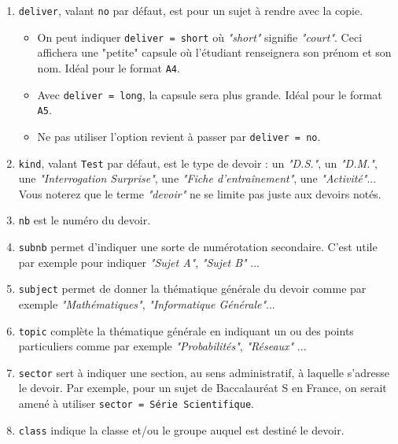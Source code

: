 \documentclass[12pt,a4paper]{scrartcl}
\theoremstyle{definition}
\begin{document}
\begin{enumerate}
    \item \verb+deliver+, valant \verb+no+ par défaut, est pour un sujet à rendre avec la copie.
    \begin{itemize}
        \setlength\itemsep{0em}

        \item On peut indiquer \verb+deliver = short+ où \emph{"short"} signifie \emph{"court"}. Ceci affichera une "petite" capsule où l'étudiant renseignera son prénom et son nom. Idéal pour le format \verb+A4+.

        \item Avec \verb+deliver = long+, la capsule sera plus grande. Idéal pour le format \verb+A5+.

        \item Ne pas utiliser l'option revient à passer par \verb+deliver = no+.
    \end{itemize}

    \item \verb+kind+, valant \verb+Test+ par défaut, est le type de devoir : un \emph{"D.S."}, un \emph{"D.M."}, une \emph{"Interrogation Surprise"}, une \emph{"Fiche d'entraînement"}, une \emph{"Activité"}...
    Vous noterez que le terme \emph{"devoir"} ne se limite pas juste aux devoirs notés.

    \item \verb+nb+ est le numéro du devoir.

    \item \verb+subnb+ permet d'indiquer une sorte de numérotation secondaire. C'est utile par exemple pour indiquer \emph{"Sujet A"}, \emph{"Sujet B"} ...

    \item \verb+subject+ permet de donner la thématique générale du devoir comme par exemple \emph{"Mathématiques"}, \emph{"Informatique Générale"}...

    \item \verb+topic+ complète la thématique générale en indiquant un ou des points particuliers comme par exemple \emph{"Probabilités"}, \emph{"Réseaux"} ...

    \item \verb+sector+ sert à indiquer une section, au sens administratif, à laquelle s'adresse le devoir. Par exemple, pour un sujet de Baccalauréat S en France, on serait amené à utiliser \verb+sector = Série Scientifique+.

    \item \verb+class+ indique la classe et/ou le groupe auquel est destiné le devoir.


\end{enumerate}
\end{document}
